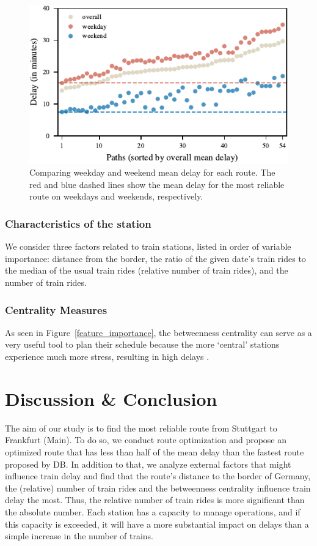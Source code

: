 \documentclass{article}
\theoremstyle{plain}
\theoremstyle{definition}
\theoremstyle{remark}
\begin{document}
\begin{figure}[h]
    \includegraphics{./fig/plot_FP_03_WeekdayWeekend.pdf}
    \caption{Comparing weekday and weekend mean delay for each route. The red and blue dashed lines show the mean delay for the most reliable route on weekdays and weekends, respectively.}
    \label{we_wd}
\end{figure}

\subsubsection{Characteristics of the station}

We consider three factors related to train stations, listed in order of variable importance: distance from the border, the ratio of the given date's train rides to the median of the usual train rides (relative number of train rides), and the number of train rides. 

\subsubsection{Centrality Measures}

As seen in Figure~\ref{feature_importance}, the betweenness centrality can serve as a very useful tool to plan their schedule because the more ‘central’ stations experience much more stress, resulting in high delays \cite{centrality}. 


\section{Discussion \& Conclusion}\label{sec:conclusion}

The aim of our study is to find the most reliable route from Stuttgart to Frankfurt (Main). To do so, we conduct route optimization and propose an optimized route that has less than half of the mean delay than the fastest route proposed by DB. In addition to that, we analyze external factors that might influence train delay and find that the route's distance to the border of Germany, the (relative) number of train rides and the betweenness centrality influence train delay the most. Thus, the relative number of train rides is more significant than the absolute number. Each station has a capacity to manage operations, and if this capacity is exceeded, it will have a more substantial impact on delays than a simple increase in the number of trains.
\end{document}
